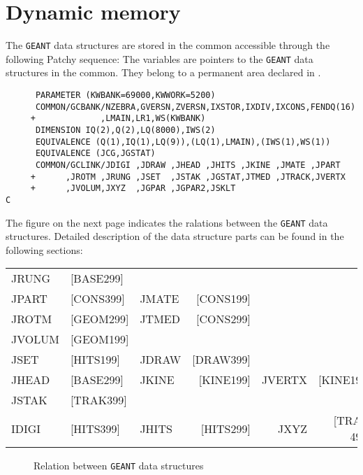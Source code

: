                 
\section{Dynamic memory}
 
The {\tt GEANT} data structures are stored in the
common  accessible through the following Patchy sequence:
The  variables are pointers to the {\tt GEANT} data structures 
in the  common. 
They belong to a permanent area declared in 
.
\begin{verbatim}
      PARAMETER (KWBANK=69000,KWWORK=5200)
      COMMON/GCBANK/NZEBRA,GVERSN,ZVERSN,IXSTOR,IXDIV,IXCONS,FENDQ(16)
     +             ,LMAIN,LR1,WS(KWBANK)
      DIMENSION IQ(2),Q(2),LQ(8000),IWS(2)
      EQUIVALENCE (Q(1),IQ(1),LQ(9)),(LQ(1),LMAIN),(IWS(1),WS(1))
      EQUIVALENCE (JCG,JGSTAT)
      COMMON/GCLINK/JDIGI ,JDRAW ,JHEAD ,JHITS ,JKINE ,JMATE ,JPART
     +      ,JROTM ,JRUNG ,JSET  ,JSTAK ,JGSTAT,JTMED ,JTRACK,JVERTX
     +      ,JVOLUM,JXYZ  ,JGPAR ,JGPAR2,JSKLT
C
\end{verbatim}
The figure on the next page indicates the ralations between the  
{\tt GEANT} data structures. 
Detailed description of the data structure parts can be found
in the following sections:
\begin{center}\tt\begin{tabular}{lllrrr}
JRUNG    &[BASE299]        \\
JPART   &[CONS399]        &JMATE    &[CONS199]  \\
JROTM   &[GEOM299]        &JTMED    &[CONS299]  \\
JVOLUM  &[GEOM199]        \\
JSET    &[HITS199]        &JDRAW    &[DRAW399]  \\
JHEAD   &[BASE299]        &JKINE    &[KINE199]  &  JVERTX & [KINE199]\\
JSTAK   &[TRAK399]        \\
IDIGI   &[HITS399]        &JHITS    &[HITS299]  &  JXYZ   & [TRAK 499]
\end{tabular}
\end{center}
\begin{figure}[hbt]
     \centering
     \caption{Relation between {\tt GEANT} data structures}
     \label{fg:base020-1}
\end{figure}
\newpage

